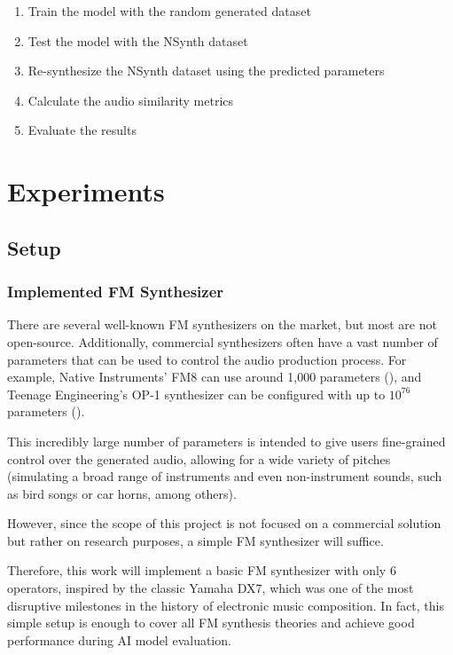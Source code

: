 \documentclass[sigconf,natbib=false]{acmart}
\begin{document}
\begin{enumerate}
\item Train the model with the random generated dataset
\item Test the model with the NSynth dataset
\item Re-synthesize the NSynth dataset using the predicted parameters
\item Calculate the audio similarity metrics
\item Evaluate the results
\end{enumerate}

\section{Experiments}

\subsection{Setup}

\subsubsection{Implemented FM Synthesizer}

There are several well-known FM synthesizers on the market, but most are not open-source. Additionally, commercial synthesizers often have a vast number of parameters that can be used to control the audio production process. For example, Native Instruments' FM8 can use around 1,000 parameters (\textcite{claesson2021resynthesis}), and Teenage Engineering’s OP-1 synthesizer can be configured with up to $10^{76}$ parameters (\textcite{claesson2021resynthesis}).

This incredibly large number of parameters is intended to give users fine-grained control over the generated audio, allowing for a wide variety of pitches (simulating a broad range of instruments and even non-instrument sounds, such as bird songs or car horns, among others).

However, since the scope of this project is not focused on a commercial solution but rather on research purposes, a simple FM synthesizer will suffice.

Therefore, this work will implement a basic FM synthesizer with only 6 operators, inspired by the classic Yamaha DX7, which was one of the most disruptive milestones in the history of electronic music composition. In fact, this simple setup is enough to cover all FM synthesis theories and achieve good performance during AI model evaluation.
\end{document}
